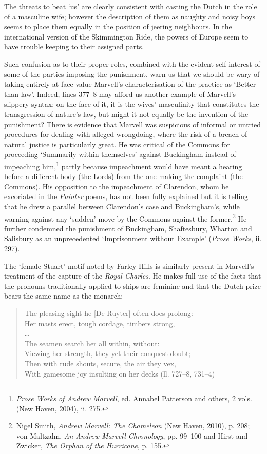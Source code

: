 ﻿\documentclass[12pt]{article}
\newcommand{\citedtitle}[1]{\textit{#1}}
\begin{document}
The
threats to beat ‘us’ are clearly consistent with casting the Dutch in the role
of a masculine wife; however the description of them as naughty and noisy boys
seems to place them equally in the position of jeering neighbours. In the
international version of the Skimmington Ride, the powers of Europe seem to
have trouble keeping to their assigned parts.

Such
confusion as to their proper roles, combined with the evident self-interest of
some of the parties imposing the punishment, warn us that we should be wary of
taking entirely at face value Marvell’s characterisation of the practice as
‘Better than law’. Indeed, lines 377–8 may afford us another example of
Marvell’s slippery syntax: on the face of it, it is the wives’ masculinity that
constitutes the transgression of nature’s law, but might it not equally be the invention
of the punishment? There is evidence that Marvell was suspicious of informal or
untried procedures for dealing with alleged wrongdoing, where the risk of a
breach of natural justice is particularly great. He was critical of the Commons
for proceeding ‘Summarily within themselves’ against Buckingham instead of
impeaching him,\footnote{\citedtitle{Prose
Works of Andrew Marvell}, ed. Annabel Patterson and others, 2 vols. (New Haven, 2004), ii. 275.}
partly because impeachment would have meant a hearing before a different body
(the Lords) from the one making the complaint (the Commons). His opposition to
the impeachment of Clarendon, whom he excoriated in the \citedtitle{Painter} poems, has not been
fully explained but it is telling that he drew a parallel between Clarendon’s
case and Buckingham’s, while warning against any ‘sudden’ move by the Commons
against the former.\footnote{Nigel Smith, \citedtitle{Andrew
Marvell: The Chameleon} (New Haven, 2010), p. 208; von Maltzahn, \citedtitle{An Andrew Marvell
Chronology}, pp. 99–100 and Hirst and Zwicker, \citedtitle{The Orphan of the Hurricane}, p. 155.}
He further condemned the punishment of Buckingham, Shaftesbury, Wharton and
Salisbury as an unprecedented ‘Imprisonment without Example’ (\citedtitle{Prose
Works}, ii. 297).

The
‘female Stuart’ motif noted by Farley-Hills is similarly present in Marvell’s
treatment of the capture of the \textit{Royal Charles}. He makes full use of
the facts that the pronouns traditionally applied to ships are feminine and
that the Dutch prize bears the same name as the monarch:

\begin{verse}
The pleasing sight he [De Ruyter] often does prolong:\\
Her masts erect, tough cordage, timbers strong,\\
…\\
The seamen search her all within, without:\\
Viewing her strength, they yet their conquest doubt;\\
Then with rude shouts, secure, the air they vex,\\
With gamesome joy insulting on her decks (ll. 727–8, 731–4)
\end{verse}
\end{document}
